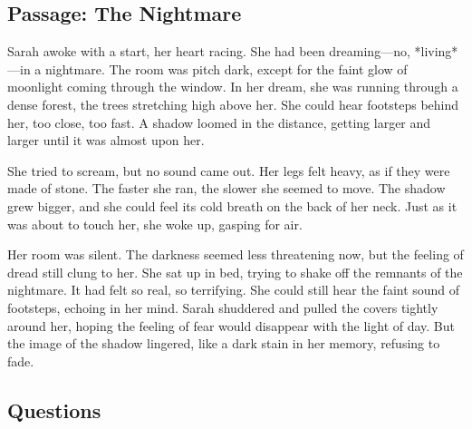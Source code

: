 \documentclass[12pt]{article}
\begin{document}
\onehalfspacing

\subsection*{Passage: The Nightmare}

\begin{tcolorbox}[colframe=black!40, colback=gray!5]
\begin{spacing}{1.15}
    Sarah awoke with a start, her heart racing. She had been dreaming—no, *living*—in a nightmare. The room was pitch dark, except for the faint glow of moonlight coming through the window. In her dream, she was running through a dense forest, the trees stretching high above her. She could hear footsteps behind her, too close, too fast. A shadow loomed in the distance, getting larger and larger until it was almost upon her.

    She tried to scream, but no sound came out. Her legs felt heavy, as if they were made of stone. The faster she ran, the slower she seemed to move. The shadow grew bigger, and she could feel its cold breath on the back of her neck. Just as it was about to touch her, she woke up, gasping for air.

    Her room was silent. The darkness seemed less threatening now, but the feeling of dread still clung to her. She sat up in bed, trying to shake off the remnants of the nightmare. It had felt so real, so terrifying. She could still hear the faint sound of footsteps, echoing in her mind. Sarah shuddered and pulled the covers tightly around her, hoping the feeling of fear would disappear with the light of day. But the image of the shadow lingered, like a dark stain in her memory, refusing to fade.
\end{spacing}
\end{tcolorbox}

\subsection*{Questions}
\end{document}
